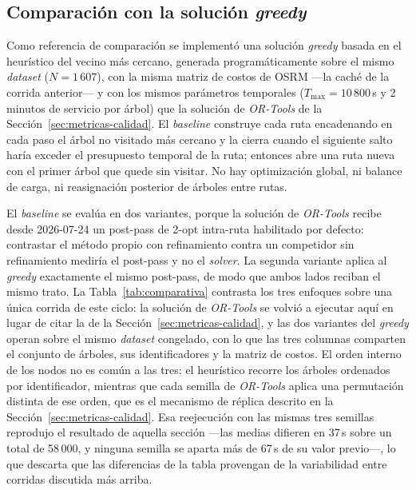 \subsection{Comparación con la solución \textit{greedy}}
\label{sec:comparacion-greedy}

Como referencia de comparación se implementó una solución \textit{greedy} basada
en el heurístico del vecino más cercano, generada programáticamente sobre el
mismo \textit{dataset} ($N = 1\,607$), con la misma matriz de costos de OSRM
---la caché de la corrida anterior--- y con los mismos parámetros temporales
($T_{\max} = 10\,800$\,s y 2 minutos de servicio por árbol) que la solución de
\textit{OR-Tools} de la Sección~\ref{sec:metricas-calidad}. El \textit{baseline} construye cada ruta
encadenando en cada paso el árbol no visitado más cercano y la cierra cuando el
siguiente salto haría exceder el presupuesto temporal de la ruta; entonces abre
una ruta nueva con el primer árbol que quede sin visitar. No hay optimización
global, ni balance de carga, ni reasignación posterior de árboles entre rutas.

El \textit{baseline} se evalúa en dos variantes, porque la solución de
\textit{OR-Tools} recibe desde 2026-07-24 un post-pass de 2-opt intra-ruta
habilitado por defecto: contrastar el método propio con refinamiento contra un
competidor sin refinamiento mediría el post-pass y no el \textit{solver}. La
segunda variante aplica al \textit{greedy} exactamente el mismo post-pass, de
modo que ambos lados reciban el mismo trato. La Tabla~\ref{tab:comparativa}
contrasta los tres enfoques sobre una única corrida de este ciclo: la solución de
\textit{OR-Tools} se volvió a ejecutar aquí en lugar de citar la de la
Sección~\ref{sec:metricas-calidad}, y las dos variantes del \textit{greedy} operan sobre el mismo
\textit{dataset} congelado, con lo que las tres columnas comparten el conjunto de
árboles, sus identificadores y la matriz de costos. El orden interno de los nodos
no es común a las tres: el heurístico recorre los árboles ordenados por
identificador, mientras que cada semilla de \textit{OR-Tools} aplica una
permutación distinta de ese orden, que es el mecanismo de réplica descrito en la
Sección~\ref{sec:metricas-calidad}. Esa reejecución con las mismas tres semillas reprodujo el
resultado de aquella sección ---las medias difieren en 37\,s sobre un total de
58\,000, y ninguna semilla se aparta más de 67\,s de su valor previo---, lo que
descarta que las diferencias de la tabla provengan de la variabilidad entre
corridas discutida más arriba.

